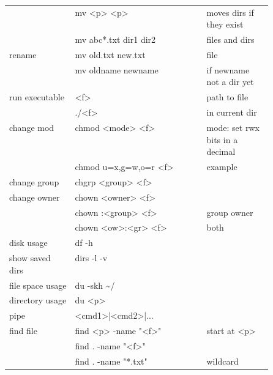 {\begin{tabularx}{\linewidth}{@{} p{0.25\linewidth}>{\ttfamily}lp{0.25\linewidth} @{}}
                             & mv <p> <p>                 & moves dirs if they exist         \\
                             & mv abc*.txt dir1 dir2      & files and dirs                   \\
        rename               & mv old.txt new.txt         & file                             \\
                             & mv oldname newname         & if newname not a dir yet         \\
        run executable       & <f>                        & path to file                     \\
                             & ./<f>                      & in current dir                   \\
        change mod           & chmod <mode> <f>           & mode: set rwx bits in a decimal  \\
                             & chmod u=x,g=w,o=r <f>      & example                          \\
        change group         & chgrp <group> <f>          &                                  \\
        change owner         & chown <owner> <f>          &                                  \\
                             & chown :<group> <f>         & group owner                      \\
                             & chown <ow>:<gr> <f>        & both                             \\
        disk usage           & df -h                      &                                  \\
        show saved dirs      & dirs -l -v                 &                                  \\
        file space usage     & du -skh \textasciitilde{}/ &                                  \\
        directory usage      & du <p>                     &                                  \\
        pipe                 & <cmd1>|<cmd2>|...          &                                  \\
        find file            & find <p> -name "<f>"       & start at <p>                     \\
                             & find . -name "<f>"         &                                  \\
                             & find . -name "*.txt"       & wildcard                         \\

\end{tabularx}}
